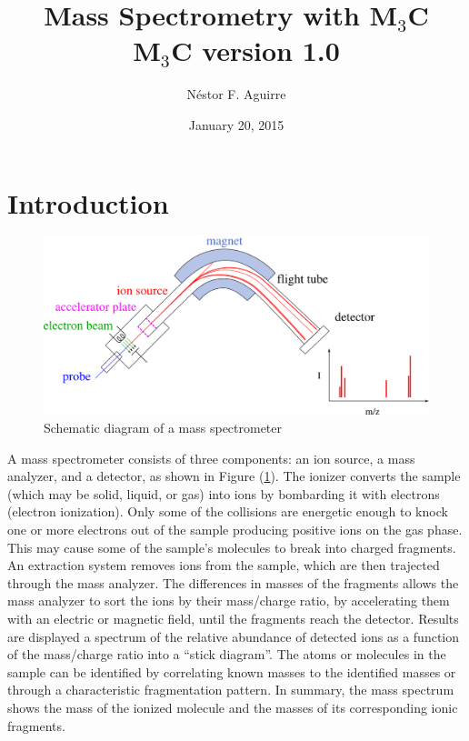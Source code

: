 \documentclass[a4paper,12pt]{article}
\title{
\textbf{Mass Spectrometry with M$_3$C} \\[1cm]
M$_3$C version 1.0
}
\author{Néstor F. Aguirre}
\date{January 20, 2015}
\begin{document}

\maketitle

\tableofcontents
\newpage

\section{Introduction}

\begin{figure}[h]
\centering
\includegraphics[scale=0.15]{images/MassSpectrometry.eps}
\caption{\footnotesize{
Schematic diagram of a mass spectrometer
}}
\label{fig: schematic diagram mass spectrometer}
\end{figure}

A mass spectrometer consists of three components: an ion source, a mass analyzer, and a detector, as shown in Figure (\ref{fig: schematic diagram mass spectrometer}). 
The ionizer converts the sample (which may be solid, liquid, or gas) into ions by bombarding it with electrons (electron ionization).
Only some of the collisions are energetic enough to knock one or more electrons out of the sample producing positive ions on the gas phase.
This may cause some of the sample's molecules to break into charged fragments.
An extraction system removes ions from the sample, which are then trajected through the mass analyzer.
The differences in masses of the fragments allows the mass analyzer to sort the ions by their mass/charge ratio, by
accelerating them with an electric or magnetic field, until the fragments reach the detector.
Results are displayed a spectrum of the relative abundance of detected ions as a function of the mass/charge ratio into 
a ``stick diagram''.
The atoms or molecules in the sample can be identified by correlating known masses to the identified masses or through a characteristic fragmentation pattern.
In summary, the mass spectrum shows the mass of the ionized molecule and the masses of its corresponding ionic fragments.
\end{document}
